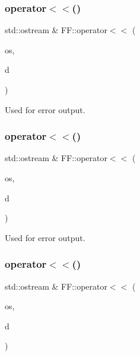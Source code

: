 \subsubsection{\texorpdfstring{operator$<$$<$()}{operator<<()}\hspace{0.1cm}{\footnotesize\ttfamily [3/5]}}
{\footnotesize\ttfamily std\+::ostream \& F\+F\+::operator$<$$<$ (\begin{DoxyParamCaption}\item[{std\+::ostream \&}]{os,  }\item[{const \mbox{\hyperlink{structFF_1_1KeyHadron2PtCorr__t}{Key\+Hadron2\+Pt\+Corr\+\_\+t}} \&}]{d }\end{DoxyParamCaption})}



Used for error output. 

\mbox{\label{namespaceFF_aa86be255f897379f638160fcf2504397}} 
\subsubsection{\texorpdfstring{operator$<$$<$()}{operator<<()}\hspace{0.1cm}{\footnotesize\ttfamily [4/5]}}
{\footnotesize\ttfamily std\+::ostream \& F\+F\+::operator$<$$<$ (\begin{DoxyParamCaption}\item[{std\+::ostream \&}]{os,  }\item[{const \mbox{\hyperlink{structFF_1_1KeyHadron1PtCorr__t}{Key\+Hadron1\+Pt\+Corr\+\_\+t}} \&}]{d }\end{DoxyParamCaption})}



Used for error output. 

\mbox{\label{namespaceFF_aec2159c099eb8feb14ba92b783ce7493}} 
\subsubsection{\texorpdfstring{operator$<$$<$()}{operator<<()}\hspace{0.1cm}{\footnotesize\ttfamily [5/5]}}
{\footnotesize\ttfamily std\+::ostream \& F\+F\+::operator$<$$<$ (\begin{DoxyParamCaption}\item[{std\+::ostream \&}]{os,  }\item[{const \mbox{\hyperlink{structFF_1_1KeyHadron3PtCorr__t}{Key\+Hadron3\+Pt\+Corr\+\_\+t}} \&}]{d }\end{DoxyParamCaption})}



